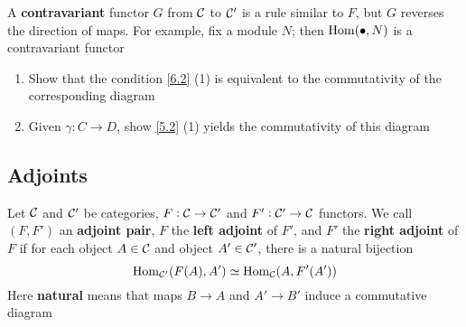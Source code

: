 \documentclass[11pt]{article}
\begin{document}
A \textbf{contravariant} functor \(G\) from \(\mathcal{C}\) to \(\mathcal{C}'\) is a rule similar
to \(F\), but \(G\) reverses the direction of maps. For example, fix a module
\(N\); then \(\operatorname{Hom}(\bullet,N)\) is a contravariant functor

\begin{exercise}
\label{6.3}
\begin{enumerate}
\item Show that the condition \ref{6.2} (1) is equivalent to the commutativity of
the corresponding diagram
\begin{center}
\end{center}
\item Given \(\gamma:C\to D\), show \ref{5.2} (1) yields the commutativity of this
diagram
\begin{center}
\end{center}
\end{enumerate}
\end{exercise}
\subsection*{Adjoints \label{6.4}}
\label{sec:orgb39ce1b}
Let \(\mathcal{C}\) and \(\mathcal{C}'\) be categories, \(F:\mathcal{C}\to\mathcal{C}'\) and
\(F':\mathcal{C}'\to\mathcal{C}\) functors. We call \((F,F')\) an \textbf{adjoint pair}, \(F\) the
\textbf{left adjoint} of \(F'\), and \(F'\) the \textbf{right adjoint} of \(F\) if for each
object \(A\in\mathcal{C}\) and object \(A'\in\mathcal{C}'\), there is a natural bijection
\begin{equation*}
\operatorname{Hom}_{\mathcal{C}'}(F(A),A')\simeq\operatorname{Hom}_{\mathcal{C}}(A,F'(A'))
\end{equation*}
Here \textbf{natural} means that maps \(B\to A\) and \(A'\to B'\) induce a commutative
diagram
\begin{center}
\end{center}
\end{document}
